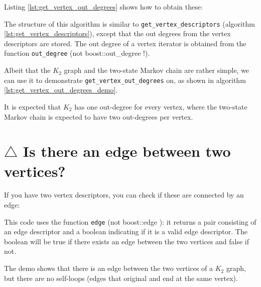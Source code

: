 Listing \ref{lst:get_vertex_out_degrees}
shows how to obtain these:



The structure of this algorithm is similar to 
\verb;get_vertex_descriptors; (algorithm \ref{lst:get_vertex_descriptors}), 
except that the out degrees from the vertex descriptors are stored.
The out degree of a vertex iterator is obtained from 
the function \verb;out_degree; 
(not boost::out_degree !).
 
Albeit that the $K_{2}$
graph and the two-state Markov chain are rather simple, we can use it to
demonstrate \verb;get_vertex_out_degrees; on, as shown in algorithm 
\ref{lst:get_vertex_out_degrees_demo}.



It is expected that $K_{2}$
has one out-degree for every vertex, where the two-state Markov chain is
expected to have two out-degrees per vertex.

\section{$\triangle$ Is there an edge between two vertices?}
\label{subsec:has_edge_between_vertices}

If you have two vertex descriptors, you can check if these are connected
 by an edge:



This code uses the function \verb;edge; 
(not boost::edge ): 
it returns a pair consisting of an edge descriptor and a boolean indicating
if it is a valid edge descriptor.
The boolean will be true if there exists an edge between the two vertices
and false if not.

The demo shows that there is an edge between the two vertices of a 
$K_{2}$ graph, but there are no self-loops (edges that original and end at the
 same vertex).

